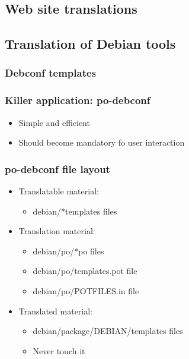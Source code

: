 \documentclass{beamer}
\begin{document}
\subsection{Web site translations}

\begin{frame}
  \frametitle{}
\end{frame}

\begin{frame}
  \frametitle{}
\end{frame}

\begin{frame}
  \frametitle{}
\end{frame}

\subsection{Translation of Debian tools}

\subsubsection{Debconf templates}

\begin{frame}
  \frametitle{Killer application: po-debconf}
	\begin{itemize}
	\item
		Simple and efficient
	\item
		Should become mandatory fo user interaction
	\end{itemize}
\end{frame}

\begin{frame}
  \frametitle{po-debconf file layout}
	\begin{itemize}
	\item
		Translatable material:
		\begin{itemize}
		\item
			debian/*templates files
		\end{itemize}
	\item
		Translation material:
		\begin{itemize}
		\item
			debian/po/*po files
		\item
			debian/po/templates.pot file
		\item
			debian/po/POTFILES.in file
		\end{itemize}
	\item
		Translated material:
		\begin{itemize}
		\item
			debian/package/DEBIAN/templates files
		\item
			Never touch it
		\end{itemize}
	\end{itemize}
\end{frame}
\end{document}
